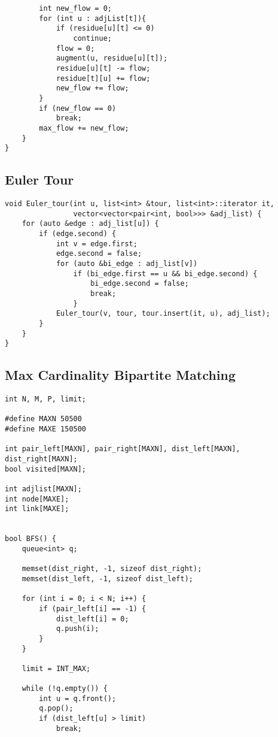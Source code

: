\documentclass[10pt,landscape]{article}
\begin{document}
\begin{multicols}{2}
\begin{lstlisting}
        int new_flow = 0;
        for (int u : adjList[t]){
            if (residue[u][t] <= 0)
                continue;
            flow = 0;
            augment(u, residue[u][t]);
            residue[u][t] -= flow;
            residue[t][u] += flow;
            new_flow += flow;
        }
        if (new_flow == 0)
            break;
        max_flow += new_flow; 
    }
}
\end{lstlisting}

\subsection{Euler Tour}
\begin{lstlisting}
void Euler_tour(int u, list<int> &tour, list<int>::iterator it, 
                vector<vector<pair<int, bool>>> &adj_list) {
    for (auto &edge : adj_list[u]) {
        if (edge.second) {
            int v = edge.first;
            edge.second = false;
            for (auto &bi_edge : adj_list[v]) 
                if (bi_edge.first == u && bi_edge.second) {
                    bi_edge.second = false;
                    break;
                }
            Euler_tour(v, tour, tour.insert(it, u), adj_list);
        }
    }
}
\end{lstlisting}

\subsection{Max Cardinality Bipartite Matching}
\begin{lstlisting}
int N, M, P, limit;

#define MAXN 50500
#define MAXE 150500
 
int pair_left[MAXN], pair_right[MAXN], dist_left[MAXN], dist_right[MAXN];
bool visited[MAXN];

int adjlist[MAXN];
int node[MAXE];
int link[MAXE];

 
bool BFS() {
    queue<int> q;
 
    memset(dist_right, -1, sizeof dist_right);
    memset(dist_left, -1, sizeof dist_left);
 
    for (int i = 0; i < N; i++) {
        if (pair_left[i] == -1) {
            dist_left[i] = 0;
            q.push(i);
        }
    }
 
    limit = INT_MAX;
 
    while (!q.empty()) {
        int u = q.front();
        q.pop();
        if (dist_left[u] > limit)
            break;
 

\end{lstlisting}
\end{multicols}
\end{document}
